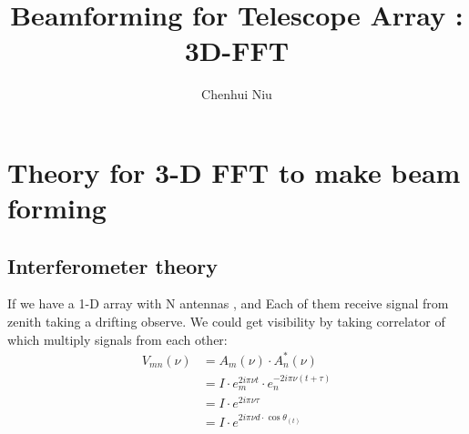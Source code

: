 \documentclass{article}
\title{Beamforming for Telescope Array : 3D-FFT }
\author{Chenhui Niu}
\begin{document}
\maketitle
\section{Theory for 3-D FFT to make beam forming}
\subsection{Interferometer theory}
If we have a 1-D array with N antennas , and Each of them receive signal from zenith taking a drifting observe. We could get visibility by taking correlator of which multiply signals from each other:\\
\begin{align*}
V_{mn}(\nu) &= A_m(\nu) \cdot A_n^*(\nu) \\
 	   		&= I \cdot e^{2i \pi \nu t}_m\cdot e^{-2i \pi \nu (t +\tau )}_n\\
 	   		&= I \cdot e^{2i \pi \nu \tau }\\
 	   		&= I \cdot e^{2i \pi \nu d\cdot \cos\theta_{(t)} }\\ 	  	   				
\end{align*}
\end{document}
